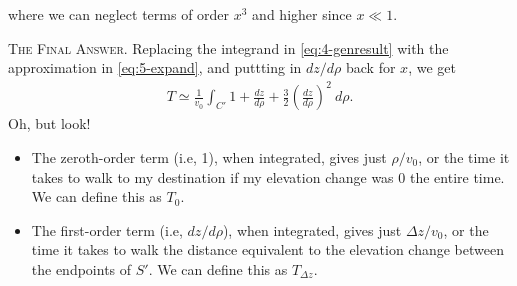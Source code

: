 \documentclass[12pt]{article}
\begin{document}
where we can neglect terms of order $x^3$ and higher since $x \ll 1$.

\vspace{10pt} \textsc{The Final Answer.} Replacing the integrand in \eqref{eq:4-genresult} with the approximation in \eqref{eq:5-expand}, and puttting in $dz/d\rho$ back for $x$, we get
\begin{align*}
T \simeq \frac{1}{v_{0}} \int_{C'}1+\frac{dz}{d\rho}+\frac{3}{2}\left( \frac{dz}{d\rho} \right)^2 \: d\rho.
\end{align*}
Oh, but look! 
\begin{itemize}
\item The zeroth-order term (i.e, 1), when integrated, gives just $\rho / v_{0}$, or the time it takes to walk to my destination if my elevation change was 0 the entire time. We can define this as $T_{0}$. 
\item The first-order term (i.e, $dz/d\rho$), when integrated, gives just $\Delta z / v_{0}$, or the time it takes to walk the distance equivalent to the elevation change between the endpoints of $S'$. We can define this as $T_{\Delta z}$. 
\end{itemize}
\end{document}
